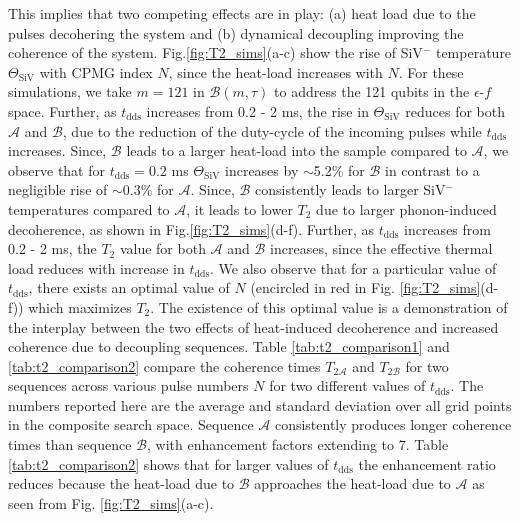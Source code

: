\documentclass[%
 reprint,
 superscriptaddress,
 amsmath,amssymb,
 aps,
 prx,
]{revtex4-2}
\begin{document}
This implies that two competing effects are in play: (a) heat load due to the pulses decohering the system and (b) dynamical decoupling improving the coherence of the system. Fig.\ref{fig:T2_sims}(a-c) show the rise of SiV$^{-}$ temperature $\Theta_{\text{SiV}}$ with CPMG index $N$, since the heat-load increases with $N$. For these simulations, we take $m=121$ in $\mathcal{B}(m,\tau)$ to address the 121 qubits in the $\epsilon$-$f$ space. Further, as $t_{\text{dds}}$ increases from 0.2 - 2 ms, the rise in $\Theta_{\text{SiV}}$ reduces for both $\mathcal{A}$ and $\mathcal{B}$, due to the reduction of the duty-cycle of the incoming pulses while $t_{\text{dds}}$ increases. Since, $\mathcal{B}$ leads to a larger heat-load into the sample compared to $\mathcal{A}$, we observe that for $t_{\text{dds}}= 0.2$ ms $\Theta_{\text{SiV}}$ increases by $\sim$5.2\% for $\mathcal{B}$ in contrast to a negligible rise of $\sim$0.3\% for $\mathcal{A}$. Since, $\mathcal{B}$ consistently leads to larger SiV$^{-}$ temperatures compared to $\mathcal{A}$, it leads to lower $T_{2}$ due to larger phonon-induced decoherence, as shown in Fig.\ref{fig:T2_sims}(d-f). Further, as $t_{\text{dds}}$ increases from 0.2 - 2 ms, the $T_{2}$ value for both $\mathcal{A}$ and $\mathcal{B}$ increases, since the effective thermal load reduces with increase in $t_{\text{dds}}$. We also observe that for a particular value of $t_{\text{dds}}$, there exists an optimal value of $N$ (encircled in red in Fig. \ref{fig:T2_sims}(d-f)) which maximizes $T_{2}$. The existence of this optimal value is a demonstration of the interplay between the two effects of heat-induced decoherence and increased coherence due to decoupling sequences. Table \ref{tab:t2_comparison1} and \ref{tab:t2_comparison2} compare the coherence times \( T_{2\mathcal{A}} \) and \( T_{2\mathcal{B}} \) for two sequences across various pulse numbers \( N \) for two different values of $t_{\text{dds}}$. The numbers reported here are the average and standard deviation over all grid points in the composite search space. Sequence \( \mathcal{A} \) consistently produces longer coherence times than sequence \( \mathcal{B} \), with enhancement factors extending to 7. Table \ref{tab:t2_comparison2} shows that for larger values of $t_{\text{dds}}$ the enhancement ratio reduces because the heat-load due to $\mathcal{B}$ approaches the heat-load due to $\mathcal{A}$ as seen from Fig. \ref{fig:T2_sims}(a-c). 
\end{document}
